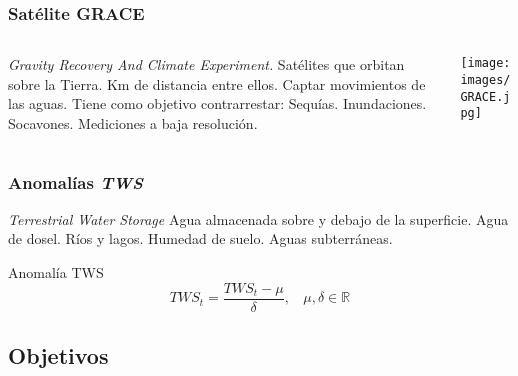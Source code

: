 \documentclass{beamer}
\begin{document}
  \begin{frame}
    \frametitle{Satélite GRACE}

    \begin{columns}

      \begin{column}{0.6\textwidth}
        \begin{outline}
          \1 \textit{Gravity Recovery And Climate Experiment.}
          \1 Satélites que orbitan sobre la Tierra.
             Km de distancia entre ellos.
          \1 Captar movimientos de las aguas.
          \2 Tiene como objetivo contrarrestar:
            \3 Sequías. 
            \3 Inundaciones.
            \3 Socavones.
          \1 Mediciones a baja resolución.
        \end{outline}
      \end{column}

      \begin{column}{0.5\textwidth}
        \begin{center}
          \texttt{[image: images/GRACE.jpg]}
        \end{center}
      \end{column}

    \end{columns}

  \end{frame}

  \begin{frame}
    \frametitle{Anomalías \textit{TWS}}

    \begin{outline}
      \1 \textit{Terrestrial Water Storage}
      \1 Agua almacenada sobre y debajo de la superficie.
        \2 Agua de dosel.
        \2 Ríos y lagos.
        \2 Humedad de suelo.
        \2 Aguas subterráneas.
    \end{outline}

    \begin{block}{Anomalía TWS}
      $$ TWS_t = \frac{TWS_t - \mu}{\delta},~~~~ \mu, \delta \in \mathbb{R}$$
    \end{block}

  \end{frame}

  \subsection*{Objetivos}
\end{document}
